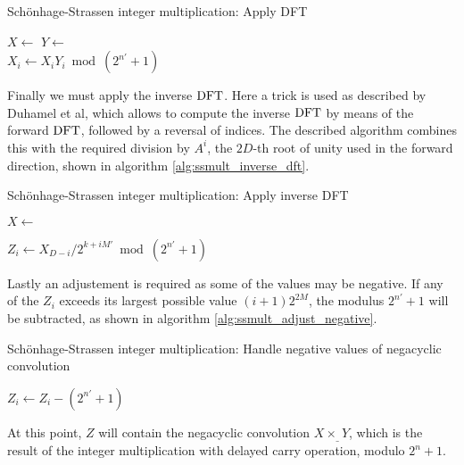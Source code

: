 \begin{algorithm}
		\caption{Schönhage-Strassen integer multiplication: Apply DFT}
		\begin{algorithmic}[1]
				\State $X \gets$ 
				\State $Y \gets$ 
				\\
				\State $X_i \gets X_i Y_i \bmod(2^{n'} + 1)$
				\EndFor
		\end{algorithmic}
		\label{alg:ssmult_dft}
\end{algorithm}

Finally we must apply the inverse $\operatorname{DFT}$. Here a trick is used as described by
Duhamel et al\autocite{duhamelComputingInverseDFT1988}, which allows to compute
the inverse $\operatorname{DFT}$ by means of the forward $\operatorname{DFT}$, followed by a reversal of
indices. The described algorithm combines this with the required division by
$A^i$, the $2D$-th root of unity used in the forward direction, shown in
algorithm \ref{alg:ssmult_inverse_dft}.

\begin{algorithm}
		\caption{Schönhage-Strassen integer multiplication: Apply inverse DFT}
		\begin{algorithmic}[1]
				\State $X \gets$ 

				\State $Z_i \gets X_{D - i} / 2^{k + iM'} \bmod (2^{n'} + 1)$
		\end{algorithmic}
		\label{alg:ssmult_inverse_dft}
\end{algorithm}

Lastly an adjustement is required as some of the values may be negative. If any
of the $Z_i$ exceeds its largest possible value $(i + 1) 2^{2M}$, the modulus
$2^{n'} + 1$ will be subtracted, as shown in algorithm
\ref{alg:ssmult_adjust_negative}.

\begin{algorithm}
		\caption{Schönhage-Strassen integer multiplication: Handle negative values of negacyclic convolution}
		\begin{algorithmic}[1]
				\State $Z_i \gets Z_i - (2^{n'} + 1)$
				\EndIf
				\EndFor
		\end{algorithmic}
		\label{alg:ssmult_adjust_negative}
\end{algorithm}

At this point, $Z$ will contain the negacyclic convolution $X \times_{\_} Y$,
which is the result of the integer multiplication with delayed carry operation,
modulo $2^{n} + 1$.


